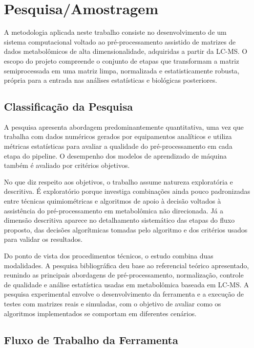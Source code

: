 % 

\chapter[Pesquisa/Amostragem]{Pesquisa/Amostragem}

A metodologia aplicada neste trabalho consiste no desenvolvimento de um sistema computacional voltado ao pré-processamento assistido de matrizes de dados metabolômicos de alta dimensionalidade, adquiridas a partir da LC-MS. O escopo do projeto compreende o conjunto de etapas que transformam a matriz semiprocessada em uma matriz limpa, normalizada e estatisticamente robusta, própria para a entrada nas análises estatísticas e biológicas posteriores.
 
\section{Classificação da Pesquisa}
A pesquisa apresenta abordagem predominantemente quantitativa, uma vez que trabalha com dados numéricos gerados por equipamentos analíticos e utiliza métricas estatísticas para avaliar a qualidade do pré-processamento em cada etapa do pipeline. O desempenho dos modelos de aprendizado de máquina também é avaliado por critérios objetivos. 

No que diz respeito aos objetivos, o trabalho assume natureza exploratória e descritiva. É exploratório porque investiga combinações ainda pouco padronizadas entre técnicas quimiométricas e algoritmos de apoio à decisão voltados à assistência do pré-processamento em metabolômica não direcionada. Já a dimensão descritiva aparece no detalhamento sistemático das etapas do fluxo proposto, das decisões algorítmicas tomadas pelo algoritmo e dos critérios usados para validar os resultados.
 
Do ponto de vista dos procedimentos técnicos, o estudo combina duas modalidades. A pesquisa bibliográfica deu base ao referencial teórico apresentado, reunindo as principais abordagens de pré-processamento, normalização, controle de qualidade e análise estatística usadas em metabolômica baseada em LC-MS. A pesquisa experimental envolve o desenvolvimento da ferramenta e a execução de testes com matrizes reais e simuladas, com o objetivo de avaliar como os algoritmos implementados se comportam em diferentes cenários.

\section{Fluxo de Trabalho da Ferramenta}
 
